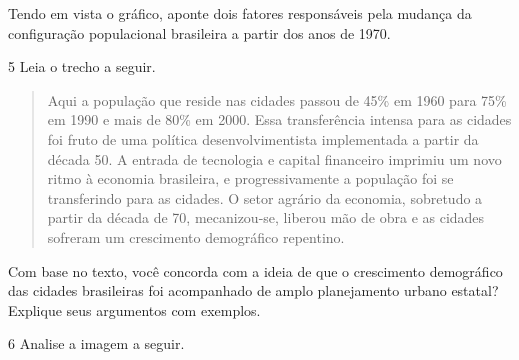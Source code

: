 Tendo em vista o gráfico, aponte dois fatores responsáveis pela mudança
da configuração populacional brasileira a partir dos anos de 1970.


\num{5} Leia o trecho a seguir.

\begin{quote}
Aqui a população que reside nas cidades passou de 45\% em 1960 para 75\%
em 1990 e mais de 80\% em 2000. Essa transferência intensa para as
cidades foi fruto de uma política desenvolvimentista implementada a
partir da década 50. A entrada de tecnologia e capital financeiro
imprimiu um novo ritmo à economia brasileira, e progressivamente a
população foi se transferindo para as cidades. O setor agrário da
economia, sobretudo a partir da década de 70, mecanizou-se, liberou mão
de obra e as cidades sofreram um crescimento demográfico repentino.

\end{quote}

Com base no texto, você concorda com a ideia de que o crescimento
demográfico das cidades brasileiras foi acompanhado de amplo
planejamento urbano estatal? Explique seus argumentos com exemplos.


\num{6} Analise a imagem a seguir.


